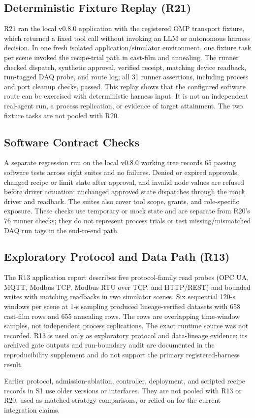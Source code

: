 \subsection{Deterministic Fixture Replay (R21)}
R21 ran the local v0.8.0 application with the registered OMP transport fixture,
which returned a fixed tool call without invoking an LLM or autonomous harness
decision. In one fresh isolated application/simulator environment, one fixture
task per scene invoked the recipe-trial path in cast-film and annealing. The
runner checked dispatch, synthetic approval, verified receipt, matching device
readback, run-tagged DAQ probe, and route log; all 31 runner assertions,
including process and port cleanup checks, passed. This replay shows that the
configured software route can be exercised with deterministic harness input.
It is not an independent real-agent run, a process replication, or evidence of
target attainment. The two fixture tasks are not pooled with R20.

\subsection{Software Contract Checks}
A separate regression run on the local v0.8.0 working tree records 65 passing
software tests across eight suites and no failures. Denied or expired
approvals, changed recipe or limit state after approval, and invalid node
values are refused before driver actuation; unchanged approved state dispatches
through the mock driver and readback. The suites also cover tool scope, grants,
and role-specific exposure. These checks use temporary or mock state and are
separate from R20's 76 runner checks; they do not represent process trials or
test missing/mismatched DAQ run tags in the end-to-end path.

\subsection{Exploratory Protocol and Data Path (R13)}
\label{sec:crossscene}
The R13 application report describes five protocol-family read probes (OPC UA,
MQTT, Modbus TCP, Modbus RTU over TCP, and HTTP/REST) and bounded writes with
matching readbacks in two simulator scenes. Six sequential 120-s windows per
scene at 1-s sampling produced lineage-verified datasets with 658 cast-film
rows and 655 annealing rows. The rows are overlapping time-window samples, not
independent process replications. The exact runtime source was not recorded. R13 is
used only as exploratory protocol and data-lineage evidence; its archived gate
outputs and run-boundary audit are documented in the reproducibility
supplement and do not support the primary registered-harness result.

Earlier protocol, admission-ablation, controller, deployment, and scripted
recipe records in S1 use older versions or interfaces. They are not pooled
with R13 or R20, used as matched strategy comparisons, or relied on for the
current integration claims.
